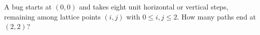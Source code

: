 A bug starts at $(0,0)$ and takes eight unit horizontal or vertical steps, remaining among lattice points $(i,j)$ with $ 0\le i,j\le2 $. How many paths end at $(2,2)$?
